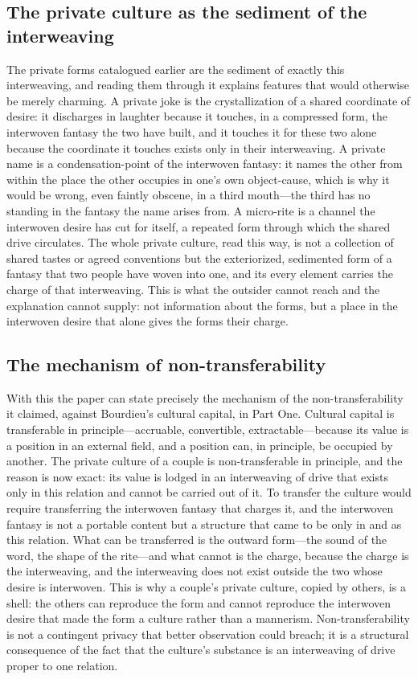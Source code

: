 \subsection*{The private culture as the sediment of the interweaving}

The private forms catalogued earlier are the sediment of exactly this interweaving, and reading them through it explains features that would otherwise be merely charming. A private joke is the crystallization of a shared coordinate of desire: it discharges in laughter because it touches, in a compressed form, the interwoven fantasy the two have built, and it touches it for these two alone because the coordinate it touches exists only in their interweaving. A private name is a condensation-point of the interwoven fantasy: it names the other from within the place the other occupies in one's own object-cause, which is why it would be wrong, even faintly obscene, in a third mouth---the third has no standing in the fantasy the name arises from. A micro-rite is a channel the interwoven desire has cut for itself, a repeated form through which the shared drive circulates. The whole private culture, read this way, is not a collection of shared tastes or agreed conventions but the exteriorized, sedimented form of a fantasy that two people have woven into one, and its every element carries the charge of that interweaving. This is what the outsider cannot reach and the explanation cannot supply: not information about the forms, but a place in the interwoven desire that alone gives the forms their charge.

\subsection*{The mechanism of non-transferability}

With this the paper can state precisely the mechanism of the non-transferability it claimed, against Bourdieu's cultural capital, in Part One. Cultural capital is transferable in principle---accruable, convertible, extractable---because its value is a position in an external field, and a position can, in principle, be occupied by another. The private culture of a couple is non-transferable in principle, and the reason is now exact: its value is lodged in an interweaving of drive that exists only in this relation and cannot be carried out of it. To transfer the culture would require transferring the interwoven fantasy that charges it, and the interwoven fantasy is not a portable content but a structure that came to be only in and as this relation. What can be transferred is the outward form---the sound of the word, the shape of the rite---and what cannot is the charge, because the charge is the interweaving, and the interweaving does not exist outside the two whose desire is interwoven. This is why a couple's private culture, copied by others, is a shell: the others can reproduce the form and cannot reproduce the interwoven desire that made the form a culture rather than a mannerism. Non-transferability is not a contingent privacy that better observation could breach; it is a structural consequence of the fact that the culture's substance is an interweaving of drive proper to one relation.

